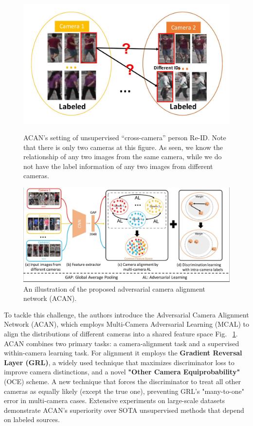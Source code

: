 \documentclass[12pt, a4paper]{article}
\begin{document}
\begin{figure}[h]
    \centering
    \begin{minipage}{0.45\textwidth}
        \centering
        \includegraphics[width=\linewidth]{pictures/acan_inter_labeling}
        \caption{ACAN's setting of unsupervised “cross-camera” person Re-ID. Note that there is only two cameras at this  figure. As seen, we know the relationship of any two images from the same camera, while we do not have the label information of any two images from different cameras.}
        \label{fig:acan_inter_labeling}
    \end{minipage}
    \hfill
    \begin{minipage}{0.45\textwidth}
        \centering
        \includegraphics[width=\linewidth]{pictures/acan_pipe}
        \caption{An illustration of the proposed adversarial camera alignment network (ACAN).}
        \label{fig:acan_pipe}
    \end{minipage}
\end{figure}

To tackle this challenge, the authors introduce the Adversarial Camera Alignment Network (ACAN), which employs Multi-Camera Adversarial Learning (MCAL) to align the distributions of different cameras into a shared feature space Fig. ~\ref{fig:acan_pipe}. ACAN combines two primary tasks: a camera-alignment task and a supervised within-camera learning task. For alignment it employs the \textbf{Gradient Reversal Layer (GRL)}, a widely used technique that maximizes discriminator loss to improve camera distinctions, and a novel \textbf{"Other Camera Equiprobability"} (OCE) scheme. A new technique that forces the discriminator to treat all other cameras as equally likely (except the true one), preventing GRL’s "many-to-one" error in multi-camera cases. Extensive experiments on large-scale datasets demonstrate ACAN’s superiority over SOTA unsupervised methods that depend on labeled sources. 
\end{document}
